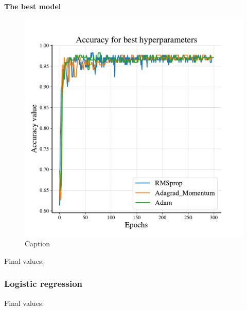 \textbf{The best model}

\begin{figure}
    \centering
    \includegraphics[width=1.0\linewidth]{project_2/figures/best_classification.pdf}
    \caption{Caption}
    \label{fig:best_cancer}
\end{figure}

Final values: 


\subsubsection{Logistic regression}

Final values: 












